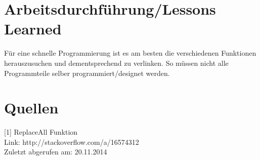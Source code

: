 \documentclass[a4paper, 11pt]{article}
\begin{document}
\section{Arbeitsdurchführung/Lessons Learned}

Für eine schnelle Programmierung ist es am besten die verschiedenen Funktionen herauszusuchen und dementsprechend zu verlinken.
So müssen nicht alle Programmteile selber programmiert/designet werden.



\section{Quellen}
[1] ReplaceAll Funktion \\
Link: http://stackoverflow.com/a/16574312 \\
Zuletzt abgerufen am: 20.11.2014 \\
\end{document}
